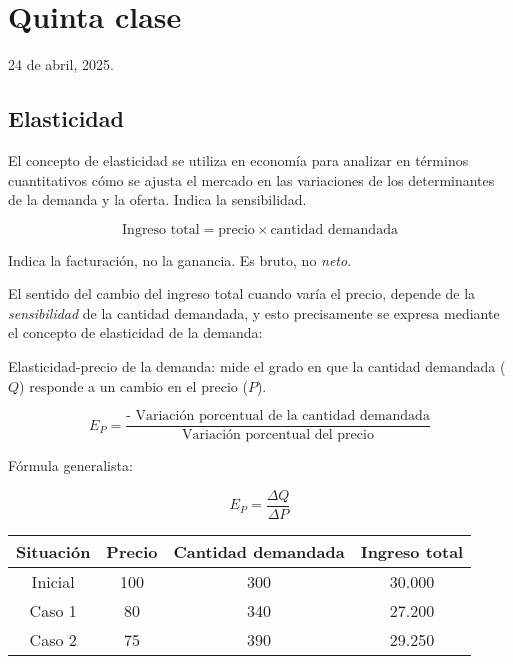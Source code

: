 \section{Quinta clase}

24 de abril, 2025.

\subsection{Elasticidad}

El concepto de elasticidad se utiliza en economía para analizar en términos cuantitativos
cómo se ajusta el mercado en las variaciones de los determinantes de la demanda y la oferta.
Indica la sensibilidad.

\begin{equation*}
    \text{Ingreso total} = \text{precio} \times \text{cantidad demandada}
\end{equation*}

Indica la facturación, no la ganancia.
Es bruto, no \textit{neto}.

El sentido del cambio del ingreso total cuando varía el precio,
depende de la \textit{sensibilidad} de la cantidad demandada,
y esto precisamente se expresa mediante el concepto de elasticidad de la demanda:

Elasticidad-precio de la demanda:
mide el grado en que la cantidad demandada (\(Q\)) responde a un cambio en el precio (\(P\)).

\begin{equation*}
    E_P = \frac{\text{- Variación porcentual de la cantidad demandada}}{\text{Variación porcentual del precio}}
\end{equation*}

Fórmula generalista:

\begin{equation*}
    E_P = \frac{\Delta Q}{\Delta P}
\end{equation*}

\begin{table}[h!]
    \centering
    \begin{tabular}{cccc} %
        \hline
        Situación & Precio & Cantidad demandada & Ingreso total \\
        \hline
        Inicial   & 100    & 300                & 30.000        \\
        Caso 1    & 80     & 340                & 27.200        \\
        Caso 2    & 75     & 390                & 29.250        \\
        \hline
    \end{tabular}
\end{table}

